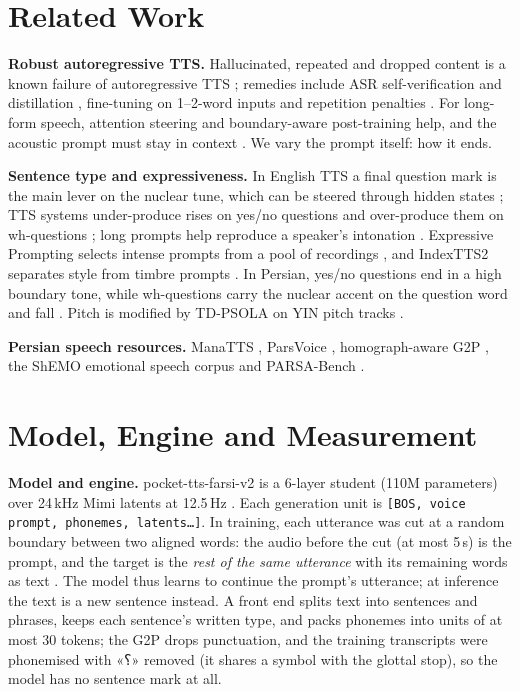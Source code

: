 \documentclass[conference]{IEEEtran}
\newcommand{\fa}[1]{{\persianfont\beginR #1\endR}}
\begin{document}
\section{Related Work}\label{sec:related}
\textbf{Robust autoregressive TTS.} Hallucinated, repeated and dropped content is a known failure of
autoregressive TTS \cite{koel2025,borodin2026repetition}; remedies include ASR self-verification and
distillation \cite{asaria2026}, fine-tuning on 1--2-word inputs \cite{gepard2026} and repetition penalties
\cite{lemas2026,loopguard2026}. For long-form speech, attention steering \cite{magpielf2026} and boundary-aware
post-training \cite{liu2026boundary} help, and the acoustic prompt must stay in context
\cite{lim2026longer}. We vary the prompt itself: how it ends.

\textbf{Sentence type and expressiveness.} In English TTS a final question mark is the main lever on the
nuclear tune, which can be steered through hidden states \cite{vigneaux2026tunes}; TTS systems under-produce
rises on yes/no questions and over-produce them on wh-questions \cite{salem2026question}; long prompts help
reproduce a speaker's intonation \cite{chen2026lptts}. Expressive Prompting selects intense prompts from a
pool of recordings \cite{expprompt2026}, and IndexTTS2 separates style from timbre prompts
\cite{indextts2026}. In Persian, yes/no questions end in a high boundary tone, while wh-questions carry the
nuclear accent on the question word and fall \cite{sadat2011}. Pitch is modified by TD-PSOLA
\cite{psola1990} on YIN pitch tracks \cite{yin2002}.

\textbf{Persian speech resources.} ManaTTS \cite{manatts2025}, ParsVoice \cite{parsvoice2026}, homograph-aware
G2P \cite{homorich2025}, the ShEMO emotional speech corpus \cite{shemo2019} and PARSA-Bench
\cite{parsabench2026}.

\section{Model, Engine and Measurement}\label{sec:measure}
\textbf{Model and engine.} pocket-tts-farsi-v2 \cite{farsiv2} is a 6-layer student (110M parameters) over
24\,kHz Mimi latents at 12.5\,Hz \cite{moshi2024}. Each generation unit is
\texttt{[BOS, voice prompt, phonemes, latents\ldots]}. In training, each utterance was cut at a random
boundary between two aligned words: the audio before the cut (at most 5\,s) is the prompt, and the target
is the \emph{rest of the same utterance} with its remaining words as text \cite{farsiv2}. The model thus
learns to continue the prompt's utterance; at inference the text is a new sentence instead. A front end splits text into sentences and
phrases, keeps each sentence's written type, and packs phonemes into units of at most 30 tokens; the G2P
drops punctuation, and the training transcripts were phonemised with \fa{«؟»} removed (it shares a symbol
with the glottal stop), so the model has no sentence mark at all.
\end{document}
